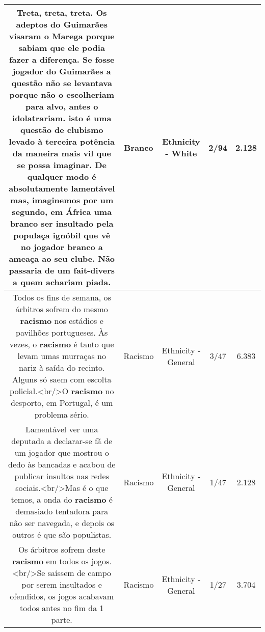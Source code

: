 \documentclass[11pt]{article}
\newlength\mylength
\begin{document}
\begin{center}
\begin{longtable}{|C{.65\mylength}|C{.30\mylength}|C{.12\mylength}|C{.12\mylength}|C{.12\mylength}|}
  \small Treta, treta, treta. Os adeptos do Guimarães visaram o Marega porque sabiam que ele podia fazer a diferença. Se fosse jogador do Guimarães a questão não se levantava porque não o escolheriam para alvo, antes o idolatrariam. isto é uma questão de clubismo levado à terceira potência da maneira mais vil que se possa imaginar. De qualquer modo é absolutamente lamentável mas, imaginemos por um segundo, em África uma \textbf{branco} ser insultado pela populaça ignóbil que vê no jogador \textbf{branco} a ameaça ao seu clube. Não passaria de um fait-divers a quem achariam piada.\normalsize   & Branco & Ethnicity - White & 2/94 & 2.128 \\  \hline
  \small Todos os fins de semana, os árbitros sofrem do mesmo \textbf{racismo} nos estádios e pavilhões portugueses. Às vezes, o \textbf{racismo} é tanto que levam umas murraças no nariz à saída do recinto. Alguns só saem com escolta policial.<br/>O \textbf{racismo} no desporto, em Portugal, é um problema sério.\normalsize   & Racismo & Ethnicity - General & 3/47 & 6.383 \\  \hline
  \small Lamentável ver uma deputada a declarar-se fã de um jogador que mostrou o dedo às bancadas e acabou de publicar insultos nas redes sociais.<br/>Mas é o que temos, a onda do \textbf{racismo} é demasiado tentadora para não ser navegada, e depois os outros é que são populistas.\normalsize   & Racismo & Ethnicity - General & 1/47 & 2.128 \\  \hline
  \small Os árbitros sofrem deste \textbf{racismo} em todos os jogos.<br/>Se saíssem de campo por serem insultados e ofendidos, os jogos acabavam todos antes no fim da 1 parte.\normalsize   & Racismo & Ethnicity - General & 1/27 & 3.704 \\  \hline
  
\end{longtable}
\end{center}
\end{document}
